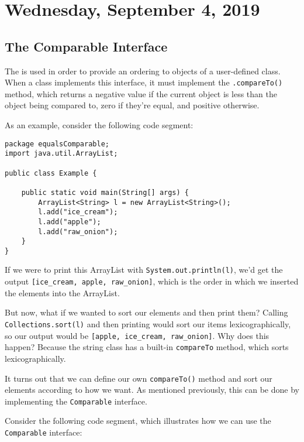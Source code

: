 \section{Wednesday, September 4, 2019}

\subsection{The Comparable Interface}

The  is used in order to provide an ordering to objects of a user-defined class. When a class implements this interface, it must implement the \verb!.compareTo()! method, which returns a negative value if the current object is less than the object being compared to, zero if they're equal, and positive otherwise.

As an example, consider the following code segment:

\begin{lstlisting}
package equalsComparable;
import java.util.ArrayList;

public class Example {

    public static void main(String[] args) {
        ArrayList<String> l = new ArrayList<String>();
        l.add("ice_cream");
        l.add("apple");
        l.add("raw_onion");
    }
}
\end{lstlisting}


If we were to print this ArrayList with \verb!System.out.println(l)!, we'd get the output \verb![ice_cream, apple, raw_onion]!, which is the order in which we inserted the elements into the ArrayList.


But now, what if we wanted to sort our elements and then print them? Calling \verb!Collections.sort(l)! and then printing would sort our items lexicographically, so our output would be \verb![apple, ice_cream, raw_onion]!. Why does this happen? Because the string class has a built-in \verb!compareTo! method, which sorts lexicographically. 


It turns out that we can define our own \verb!compareTo()! method and sort our elements according to how we want. As mentioned previously, this can be done by implementing the \verb!Comparable! interface. 


Consider the following  code segment, which illustrates how we can use the \verb!Comparable! interface:



